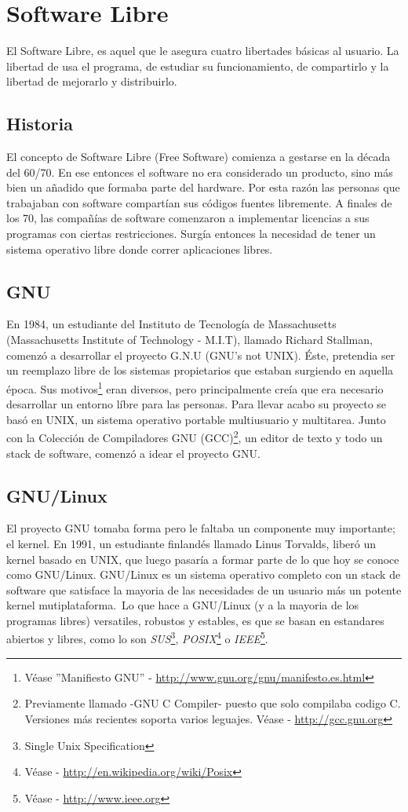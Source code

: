 \section{Software Libre}

El Software Libre, es aquel que le asegura cuatro libertades b\'asicas al
usuario. La libertad de usa el programa, de estudiar su funcionamiento, de
compartirlo y la libertad de mejorarlo y distribuirlo.

\subsection{Historia}
El concepto de Software Libre (Free Software) comienza a gestarse en la 
d\'ecada del 60/70. En ese entonces el software no era considerado un
producto, sino m\'as bien un a\~nadido que formaba parte del hardware. Por esta
raz\'on las personas que trabajaban con software compart\'ian sus c\'odigos
fuentes libremente. A finales de los 70, las compa\~n\'ias de software
comenzaron a implementar licencias a sus programas con ciertas restricciones. 
Surg\'ia entonces la necesidad de tener un sistema operativo libre donde
correr aplicaciones libres.


\subsection{GNU}
En 1984, un estudiante del Instituto de Tecnolog\'ia de Massachusetts
(Massachusetts Institute of Technology - M.I.T), llamado Richard Stallman, 
comenz\'o a desarrollar el proyecto G.N.U (GNU's not UNIX).
\'Este, pretendia ser un reemplazo libre de los sistemas propietarios que 
estaban surgiendo en aquella \'epoca.
Sus motivos\footnote{V\'ease ''Manifiesto GNU'' - 
\url{http://www.gnu.org/gnu/manifesto.es.html}} eran diversos, pero
principalmente 
cre\'ia que era necesario desarrollar un entorno l\'ibre para las personas.
Para llevar acabo su proyecto se bas\'o en UNIX, un sistema operativo 
portable multiusuario y multitarea. Junto con la Colecci\'on de Compiladores
GNU (GCC)\footnote{Previamente llamado -GNU C Compiler- puesto que solo
compilaba codigo C. Versiones m\'as recientes soporta varios leguajes. V\'ease
- \url{http://gcc.gnu.org}}, un editor de texto y todo un stack de software,
comenz\'o a idear el proyecto GNU.

\subsection{GNU/Linux}
El proyecto GNU tomaba forma pero le faltaba un componente muy importante; el
kernel. 
En 1991, un estudiante finland\'es llamado Linus Torvalds, liber\'o un kernel
basado en UNIX, que luego pasar\'ia a formar parte de lo que hoy se conoce como
GNU/Linux.
GNU/Linux es un sistema operativo completo con un stack de software que
satisface la mayoria de las necesidades de un usuario m\'as un potente kernel
mutiplataforma.\
Lo que hace a GNU/Linux (y a la mayoria de los programas libres) versatiles,
robustos y estables, es que se basan en estandares abiertos y libres, como lo
son \emph{SUS}\footnote{Single Unix Specification},
\emph{POSIX}\footnote{V\'ease - \url{http://en.wikipedia.org/wiki/Posix}} o
\emph{IEEE}\footnote{V\'ease - \url{http://www.ieee.org}}.


